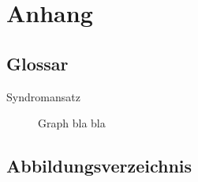 \documentclass[enabledeprecatedfontcommands,fontsize=11pt,paper=a4,twoside]{scrartcl}
\begin{document}
\section{Anhang} \label{sec:anhang}	
	\subsection{Glossar}
	
	\begin{description}
		\item[Syndromansatz] Graph bla bla
	\end{description}
	
	\subsection{Abbildungsverzeichnis}
	\listoffigures
	

\newpage



\end{document}
